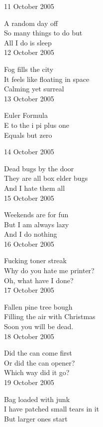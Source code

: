 \documentclass[12pt]{article}
\begin{document}
11 October 2005

A random day off \\
So many things to do but \\
All I do is sleep \\

12 October 2005

Fog fills the city \\
It feels like floating in space \\
Calming yet surreal \\


13 October 2005

Euler Formula \\
E to the i pi plus one \\
Equals but zero \\

\newpage


14 October 2005

Dead bugs by the door \\
They are all box elder bugs \\
And I hate them all \\

15 October 2005

Weekends are for fun \\
But I am always lazy \\
And I do nothing \\

16 October 2005

Fucking toner streak \\
Why do you hate me printer? \\
Oh, what have I done? \\

17 October 2005

Fallen pine tree bough \\
Filling the air with Christmas \\
Soon you will be dead. \\

18 October 2005

Did the can come first \\
Or did the can opener? \\
Which way did it go? \\

19 October 2005

Bag loaded with junk \\
I have patched small tears in it \\
But larger ones start \\
\end{document}

